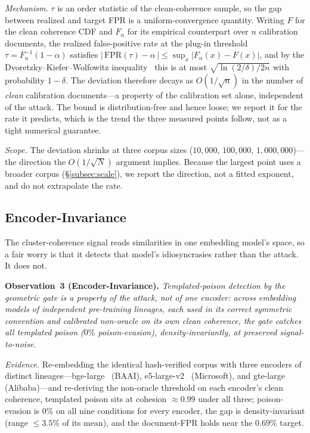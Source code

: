\documentclass[conference]{IEEEtran}
\begin{document}
\emph{Mechanism.} $\tau$ is an order statistic of the clean-coherence sample, so the gap
between realized and target FPR is a uniform-convergence quantity. Writing $F$ for the clean
coherence CDF and $F_n$ for its empirical counterpart over $n$ calibration documents, the
realized false-positive rate at the plug-in threshold
$\tau=F_n^{-1}(1-\alpha)$ satisfies
$|\,\mathrm{FPR}(\tau)-\alpha\,| \le \sup_x |F_n(x)-F(x)|$, and by the
Dvoretzky--Kiefer--Wolfowitz inequality~\cite{dkw} this is at most
$\sqrt{\ln(2/\delta)/2n}$ with probability $1-\delta$. The deviation therefore decays as
$O(1/\sqrt{n})$ in the number of \emph{clean} calibration documents---a property of the
calibration set alone, independent of the attack. The bound is distribution-free and hence
loose; we report it for the rate it predicts, which is the trend the three measured points
follow, not as a tight numerical guarantee.

\emph{Scope.} The deviation shrinks at three corpus sizes ($10{,}000$, $100{,}000$,
$1{,}000{,}000$)---the direction the $O(1/\sqrt{N})$ argument implies. Because the
largest point uses a broader corpus (\S\ref{subsec:scale}), we report the direction,
not a fitted exponent, and do not extrapolate the rate.

\subsection{Encoder-Invariance}
\label{subsec:encoder}
The cluster-coherence signal reads similarities in one embedding model's space, so a
fair worry is that it detects that model's idiosyncrasies rather than the attack. It
does not.

\smallskip
\noindent\textbf{Observation~3 (Encoder-Invariance).}
\emph{Templated-poison detection by the geometric gate is a property of the attack,
not of one encoder: across embedding models of independent pre-training lineages, each
used in its correct symmetric convention and calibrated non-oracle on its own clean
coherence, the gate catches all templated poison ($0\%$ poison-evasion), density-invariantly, at
preserved signal-to-noise.}

\emph{Evidence.} Re-embedding the identical hash-verified corpus with three encoders of
distinct lineages---bge-large~\cite{bge} (BAAI), e5-large-v2~\cite{e5} (Microsoft), and
gte-large~\cite{gte} (Alibaba)---and re-deriving the non-oracle threshold on each
encoder's clean coherence, templated poison sits at cohesion $\approx 0.99$ under all
three; poison-evasion is $0\%$ on all nine conditions for every encoder, the gap is
density-invariant (range $\le 3.5\%$ of its mean), and the document-FPR holds near the
$0.69\%$ target.
\end{document}
